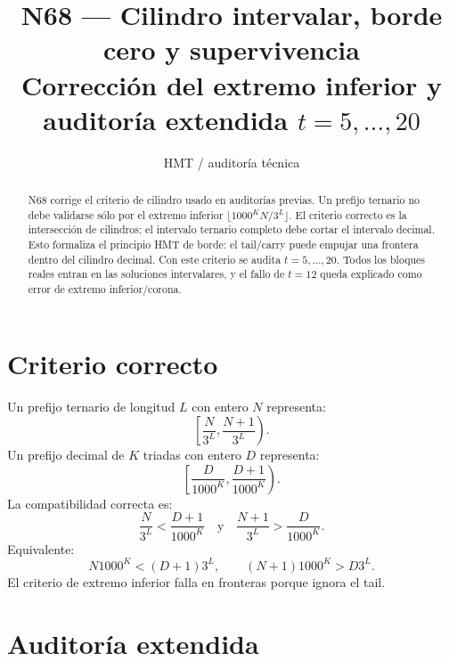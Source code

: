 \documentclass[11pt,a4paper]{article}
\title{\bfseries N68 --- Cilindro intervalar, borde cero y supervivencia\\
\large Corrección del extremo inferior y auditoría extendida \(t=5,\ldots,20\)}
\author{HMT / auditoría técnica}
\date{}
\begin{document}
\maketitle

\begin{abstract}
N68 corrige el criterio de cilindro usado en auditorías previas. Un prefijo ternario no debe validarse sólo por el extremo inferior \(\lfloor 1000^K N/3^L\rfloor\). El criterio correcto es la intersección de cilindros: el intervalo ternario completo debe cortar el intervalo decimal. Esto formaliza el principio HMT de borde: el tail/carry puede empujar una frontera dentro del cilindro decimal. Con este criterio se audita \(t=5,\ldots,20\). Todos los bloques reales entran en las soluciones intervalares, y el fallo de \(t=12\) queda explicado como error de extremo inferior/corona.
\end{abstract}

\section{Criterio correcto}

Un prefijo ternario de longitud \(L\) con entero \(N\) representa:
\[
\left[\frac{N}{3^L},\frac{N+1}{3^L}\right).
\]
Un prefijo decimal de \(K\) triadas con entero \(D\) representa:
\[
\left[\frac{D}{1000^K},\frac{D+1}{1000^K}\right).
\]
La compatibilidad correcta es:
\[
\boxed{
\frac{N}{3^L}<\frac{D+1}{1000^K}
\quad\text{y}\quad
\frac{N+1}{3^L}>\frac{D}{1000^K}.
}
\]
Equivalente:
\[
\boxed{
N1000^K<(D+1)3^L,
\qquad
(N+1)1000^K>D3^L.
}
\]
El criterio de extremo inferior falla en fronteras porque ignora el tail.

\section{Auditoría extendida}
\end{document}

